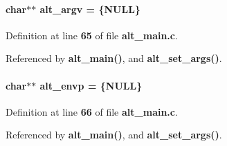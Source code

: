 \paragraph[{alt\+\_\+argv}]{\setlength{\rightskip}{0pt plus 5cm}char$\ast$$\ast$ alt\+\_\+argv = \{N\+U\+LL\}}\label{alt__main_8c_ad7125b562f4fac5d2bcd788307ab9d02}


Definition at line {\bf 65} of file {\bf alt\+\_\+main.\+c}.



Referenced by {\bf alt\+\_\+main()}, and {\bf alt\+\_\+set\+\_\+args()}.

\paragraph[{alt\+\_\+envp}]{\setlength{\rightskip}{0pt plus 5cm}char$\ast$$\ast$ alt\+\_\+envp = \{N\+U\+LL\}}\label{alt__main_8c_a5376b294c5ebc542fcf6da90860a8548}


Definition at line {\bf 66} of file {\bf alt\+\_\+main.\+c}.



Referenced by {\bf alt\+\_\+main()}, and {\bf alt\+\_\+set\+\_\+args()}.

